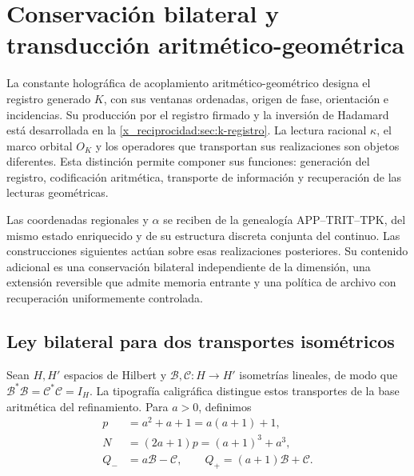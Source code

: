 \chapter{Conservación bilateral y transducción aritmético-geométrica}
\label{x_reciprocidad:lib04:bilateral}

La constante holográfica de acoplamiento aritmético-geométrico designa
el registro generado \(K\), con sus ventanas ordenadas, origen de fase,
orientación e incidencias. Su producción por el registro firmado y la
inversión de Hadamard está desarrollada en la \cref{x_reciprocidad:sec:k-registro}.
La lectura racional \(\kappa\), el marco orbital \(O_K\) y los
operadores que transportan sus realizaciones son objetos diferentes.
Esta distinción permite componer sus funciones: generación del registro,
codificación aritmética, transporte de información y recuperación de las
lecturas geométricas.

Las coordenadas regionales y \(\alpha\) se reciben de la genealogía
APP--TRIT--TPK, del mismo estado enriquecido y de su estructura discreta
conjunta del continuo. Las construcciones siguientes actúan sobre esas
realizaciones posteriores. Su contenido adicional es una conservación
bilateral independiente de la dimensión, una extensión reversible que
admite memoria entrante y una política de archivo con recuperación
uniformemente controlada.

\section{Ley bilateral para dos transportes isométricos}
\label{x_reciprocidad:lib04:ley}

Sean \(H,H'\) espacios de Hilbert y
\(\mathcal B,\mathcal C:H\to H'\) isometrías lineales, de modo que
\(\mathcal B^*\mathcal B=\mathcal C^*\mathcal C=I_H\).
La tipografía caligráfica distingue estos transportes de la base
aritmética del refinamiento. Para \(a>0\), definimos
\begin{equation}
 \begin{aligned}
 p&=a^2+a+1=a(a+1)+1,\\
 N&=(2a+1)p=(a+1)^3+a^3,\\
 Q_-&=a\mathcal B-\mathcal C,\qquad
 Q_+=(a+1)\mathcal B+\mathcal C.
 \end{aligned}
 \label{x_reciprocidad:lib04:def-q}
\end{equation}

